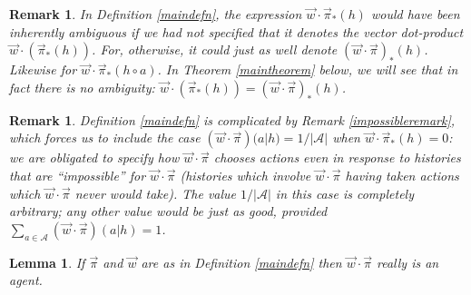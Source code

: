 \documentclass{article}
\newtheorem{remark}[theorem]{Remark}
\newtheorem{lemma}[theorem]{Lemma}
\begin{document}
\begin{remark}
\label{ambiguityremark}
    In Definition \ref{maindefn},
    the expression $\vec w\cdot \vec\pi_*(h)$ would have been inherently
    ambiguous if we had not specified that it denotes
    the vector dot-product $\vec w\cdot (\vec\pi_*(h))$.
    For, otherwise, it could just as well denote
    $(\vec w\cdot \vec\pi)_*(h)$.
    Likewise for $\vec w\cdot \vec\pi_*(h\circ a)$.
    In Theorem \ref{maintheorem} below, we will see that in fact
    there is no ambiguity: $\vec w\cdot(\vec\pi_*(h))=(\vec w\cdot \vec\pi)_*(h)$.
\end{remark}

\begin{remark}
    Definition \ref{maindefn} is complicated by Remark \ref{impossibleremark},
    which forces us to include the case
    $(\vec w\cdot\vec\pi)(a|h)=1/|\mathcal A|$ when
    $\vec w\cdot \vec\pi_*(h)=0$: we are obligated to specify how
    $\vec w\cdot\vec\pi$ chooses actions even in response to histories that
    are ``impossible'' for $\vec w\cdot\vec\pi$ (histories which involve
    $\vec w\cdot\vec\pi$ having taken actions which $\vec w\cdot\vec\pi$
    never would take). The value $1/|\mathcal A|$ in this case is completely arbitrary;
    any other value would be just as good,
    provided $\sum_{a\in\mathcal A}(\vec w\cdot\vec\pi)(a|h)=1$.
\end{remark}

\begin{lemma}
    If $\vec\pi$ and $\vec w$ are as in Definition \ref{maindefn}
    then $\vec w\cdot\vec\pi$ really is an agent.
\end{lemma}
\end{document}
